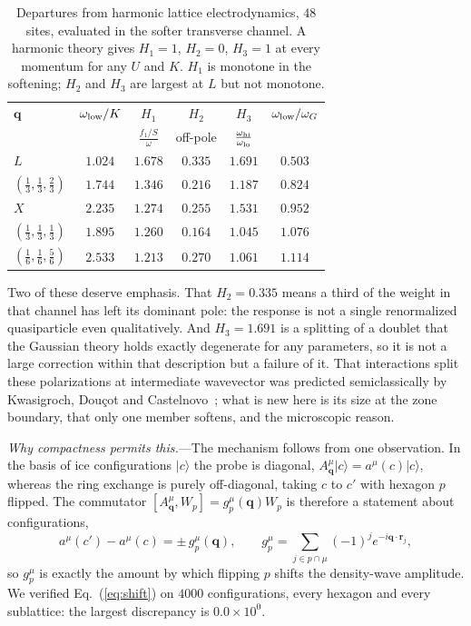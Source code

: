 \documentclass[
aps,prl,twocolumn,amsmath,amssymb,superscriptaddress,
longbibliography,floatfix
]{revtex4-2}
\newcommand{\bq}{\bm q}
\begin{document}
\begin{table}[b]
\caption{Departures from harmonic lattice electrodynamics, $48$ sites,
evaluated in the softer transverse channel. A harmonic theory gives
$H_1=1$, $H_2=0$, $H_3=1$ at every momentum for any $U$ and $K$.
$H_1$ is monotone in the softening; $H_2$ and $H_3$ are largest at $L$
but not monotone.}
\label{tab:harm}
\begin{ruledtabular}
\begin{tabular}{lccccc}
$\bq$ & $\omega_{\rm low}/K$ & $H_1$ & $H_2$ & $H_3$ &
$\omega_{\rm low}/\omega_G$\\
 & & $\frac{f_1/S}{\omega}$ & off-pole & $\frac{\omega_{\rm hi}}{\omega_{\rm lo}}$ & \\
\hline
$L$ & $1.024$ & $\bm{1.678}$ & $\bm{0.335}$ & $\bm{1.691}$ & $0.503$\\
$(\frac13,\frac13,\frac23)$ & $1.744$ & $1.346$ & $0.216$ & $1.187$
 & $0.824$\\
$X$ & $2.235$ & $1.274$ & $0.255$ & $1.531$ & $0.952$\\
$(\frac13,\frac13,\frac13)$ & $1.895$ & $1.260$ & $0.164$ & $1.045$
 & $1.076$\\
$(\frac16,\frac16,\frac56)$ & $2.533$ & $1.213$ & $0.270$ & $1.061$
 & $1.114$\\
\end{tabular}
\end{ruledtabular}
\end{table}

Two of these deserve emphasis. That $H_2=0.335$ means a third of the
weight in that channel has left its dominant pole: the response is not a
single renormalized quasiparticle even qualitatively. And $H_3=1.691$ is
a splitting of a doublet that the Gaussian theory holds exactly
degenerate for any parameters, so it is not a large correction within
that description but a failure of it. That interactions split these
polarizations at intermediate wavevector was predicted semiclassically by
Kwasigroch, Dou\c{c}ot and Castelnovo~\cite{Kwasigroch2017}; what is new
here is its size at the zone boundary, that only one member softens, and
the microscopic reason.

\emph{Why compactness permits this.}---The mechanism follows from one
observation. In the basis of ice configurations $|c\rangle$ the probe is
diagonal,
$A^\mu_{\bq}|c\rangle=a^\mu(c)|c\rangle$, whereas the ring exchange is
purely off-diagonal, taking $c$ to $c'$ with hexagon $p$ flipped. The
commutator $[A^\mu_{\bq},W_p]=g^\mu_p(\bq)W_p$ is therefore a statement
about configurations,
\begin{equation}
a^\mu(c')-a^\mu(c)=\pm\,g^\mu_p(\bq),
\qquad
g^\mu_p=\!\!\!\sum_{j\in p\cap\mu}\!\!\!(-1)^j e^{-i\bq\cdot\bm r_j},
\label{eq:shift}
\end{equation}
so $g^\mu_p$ is exactly the amount by which flipping $p$ shifts the
density-wave amplitude. We verified Eq.~(\ref{eq:shift}) on $4000$
configurations, every hexagon and every sublattice: the largest
discrepancy is $0.0\times10^{0}$.
\end{document}
